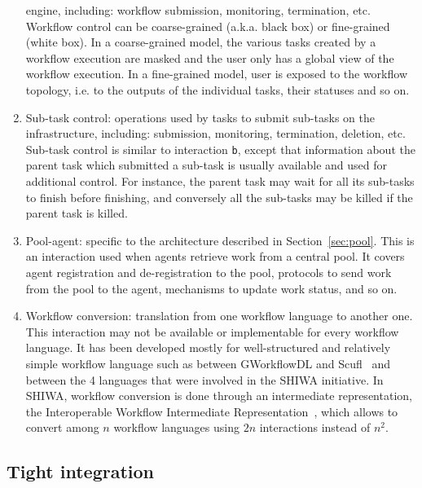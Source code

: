 \documentclass[preprint,3p,twocolumn]{elsarticle}
\begin{document}
\begin{enumerate}[leftmargin=0cm,itemindent=0.6cm,label=\texttt{(\alph*)}]
  engine, including: workflow submission, monitoring, termination,
  etc. Workflow control can be coarse-grained (a.k.a. black box) or
  fine-grained (white box). In a coarse-grained model, the various
  tasks created by a workflow execution are masked and the user only
  has a global view of the workflow execution. In a fine-grained
  model, user is exposed to the workflow topology, i.e. to the outputs
  of the individual tasks, their statuses and so on.
\item Sub-task control: operations used by tasks to submit sub-tasks
  on the infrastructure, including: submission, monitoring,
  termination, deletion, etc. Sub-task control is similar to
  interaction \texttt{b}, except that information about the parent
  task which submitted a sub-task is usually available and used for
  additional control. For instance, the parent task may wait for all
  its sub-tasks to finish before finishing, and conversely all the
  sub-tasks may be killed if the parent task is killed.
\item Pool-agent: specific to the architecture described
  in Section~\ref{sec:pool}. This is an interaction used when agents retrieve
  work from a central pool. It covers agent registration and
  de-registration to the pool, protocols to send work from the pool to
  the agent, mechanisms to update work status, and so on. 
\item Workflow conversion: translation from one workflow language to
  another one. This interaction may not be available or implementable
  for every workflow language. It has been developed mostly for
  well-structured and relatively simple workflow language such as between GWorkflowDL
  and Scufl~\cite{OLAB-09} and between the 4 languages that were involved in the
  SHIWA initiative. In SHIWA, workflow conversion is done through an
  intermediate representation, the Interoperable Workflow Intermediate
  Representation~\cite{plankensteiner-montagnat-etal:2011}, which
  allows to convert among $n$ workflow languages using $2n$
  interactions instead of $n^2$.
\end{enumerate}


\subsection{Tight integration}
\end{document}
